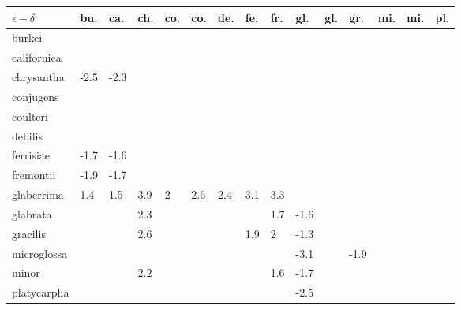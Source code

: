 \begin{table}[ht]
\centering
\begin{tabular}{lllllllllllllll}
  \hline
$\epsilon - \delta$ & bu. & ca. & ch. & co. & co. & de. & fe. & fr. & gl. & gl. & gr. & mi. & mi. & pl. \\ 
  \hline
burkei &  &  &  &  &  &  &  &  &  &  &  &  &  &  \\ 
  californica &  &  &  &  &  &  &  &  &  &  &  &  &  &  \\ 
  chrysantha & -2.5 & -2.3 &  &  &  &  &  &  &  &  &  &  &  &  \\ 
  conjugens &  &  &  &  &  &  &  &  &  &  &  &  &  &  \\ 
  coulteri &  &  &  &  &  &  &  &  &  &  &  &  &  &  \\ 
  debilis &  &  &  &  &  &  &  &  &  &  &  &  &  &  \\ 
  ferrisiae & -1.7 & -1.6 &  &  &  &  &  &  &  &  &  &  &  &  \\ 
  fremontii & -1.9 & -1.7 &  &  &  &  &  &  &  &  &  &  &  &  \\ 
  glaberrima & 1.4 & 1.5 & 3.9 & 2 & 2.6 & 2.4 & 3.1 & 3.3 &  &  &  &  &  &  \\ 
  glabrata &  &  & 2.3 &  &  &  &  & 1.7 & -1.6 &  &  &  &  &  \\ 
  gracilis &  &  & 2.6 &  &  &  & 1.9 & 2 & -1.3 &  &  &  &  &  \\ 
  microglossa &  &  &  &  &  &  &  &  & -3.1 &  & -1.9 &  &  &  \\ 
  minor &  &  & 2.2 &  &  &  &  & 1.6 & -1.7 &  &  &  &  &  \\ 
  platycarpha &  &  &  &  &  &  &  &  & -2.5 &  &  &  &  &  \\ 
   \hline
\end{tabular}
\end{table}

